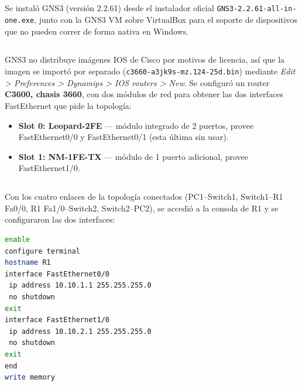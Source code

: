 \documentclass[10pt,a4paper]{article}
\begin{document}
\section{\color{colorIPN}{Desarrollo}}

\subsection{\color{colorESCOM}{Instalación de GNS3}}

Se instaló GNS3 (versión 2.2.61) desde el instalador oficial \texttt{GNS3-2.2.61-all-in-one.exe}, junto con la GNS3 VM sobre VirtualBox para el soporte de dispositivos que no pueden correr de forma nativa en Windows.

\subsection{\color{colorESCOM}{Router y módulos}}

GNS3 no distribuye imágenes IOS de Cisco por motivos de licencia, así que la imagen se importó por separado (\texttt{c3660-a3jk9s-mz.124-25d.bin}) mediante \textit{Edit > Preferences > Dynamips > IOS routers > New}. Se configuró un router \textbf{C3600, chasis 3660}, con dos módulos de red para obtener las dos interfaces FastEthernet que pide la topología:

\begin{itemize}
	\item \textbf{Slot 0: Leopard-2FE} — módulo integrado de 2 puertos, provee FastEthernet0/0 y FastEthernet0/1 (esta última sin usar).
	\item \textbf{Slot 1: NM-1FE-TX} — módulo de 1 puerto adicional, provee FastEthernet1/0.
\end{itemize}

\subsection{\color{colorESCOM}{Configuración del router (R1)}}

Con los cuatro enlaces de la topología conectados (PC1--Switch1, Switch1--R1 Fa0/0, R1 Fa1/0--Switch2, Switch2--PC2), se accedió a la consola de R1 y se configuraron las dos interfaces:

\begin{lstlisting}[language=bash, caption={Configuración de las interfaces de R1}]
enable
configure terminal
hostname R1
interface FastEthernet0/0
 ip address 10.10.1.1 255.255.255.0
 no shutdown
exit
interface FastEthernet1/0
 ip address 10.10.2.1 255.255.255.0
 no shutdown
exit
end
write memory
\end{lstlisting}
\end{document}
